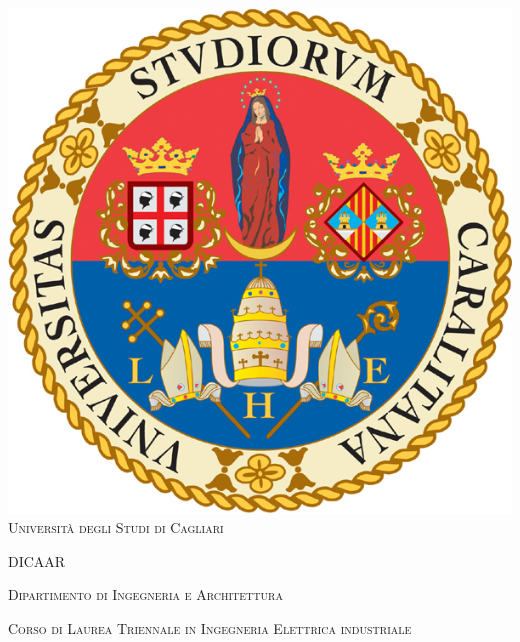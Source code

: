 \begin{titlepage}
	\begin{center}
		
		\includegraphics[scale=.45]{./title/logo_CA.jpg}
		\\
		\vspace{1cm}
		\textsc{\large Università degli Studi di Cagliari}
		\vspace{1.2cm}
		
		\textsc{\Large DICAAR}
		\vspace{0.5cm}
		
		\textsc{\large Dipartimento di Ingegneria e Architettura}
		\vspace{1.0cm}
		
		\textsc{\large Corso di Laurea {Triennale} in Ingegneria Elettrica industriale}\hspace{0.8cm}
		
		\vspace{0.8cm}
		

\end{center}
\end{titlepage}
